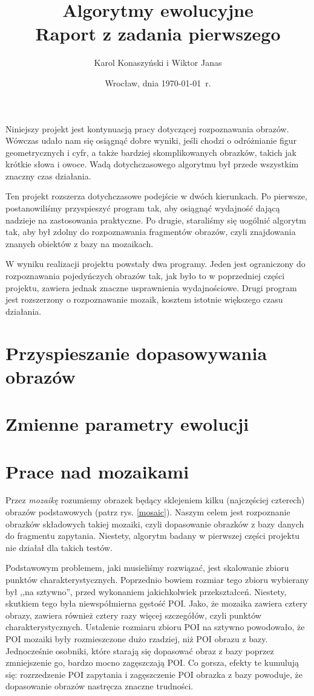 \documentclass[a4paper,12pt,leqno]{article}
\title{\textbf{Algorytmy ewolucyjne}\\
       {\Large Raport z zadania pierwszego}\\[-1ex]}
\author{Karol Konaszyński i Wiktor Janas}
\date{Wrocław, dnia \today\ r.}
\begin{document}
\maketitle

Niniejszy projekt jest kontynuacją pracy dotyczącej rozpoznawania obrazów. Wówczas udało nam się osiągnąć dobre wyniki, jeśli chodzi o odróżnianie figur geometrycznych i cyfr, a także bardziej
skomplikowanych obrazków, takich jak krótkie słowa i owoce. Wadą dotychczasowego algorytmu był przede wszystkim znaczny czas działania.

Ten projekt rozszerza dotychczasowe podejście w dwóch kierunkach. Po pierwsze, postanowiliśmy przyspieszyć program tak, aby osiągnąć wydajność dającą nadzieje na zastosowania praktyczne.
Po drugie, staraliśmy się uogólnić algorytm tak, aby był zdolny do rozpoznawania fragmentów obrazów, czyli znajdowania znanych obiektów z bazy na mozaikach.

W wyniku realizacji projektu powstały dwa programy. Jeden jest ograniczony do rozpoznawania pojedyńczych obrazów tak, jak było to w poprzedniej części projektu, zawiera jednak znaczne
usprawnienia wydajnościowe. Drugi program jest rozszerzony o rozpoznawanie mozaik, kosztem istotnie większego czasu działania.

\section{Przyspieszanie dopasowywania obrazów}

\section{Zmienne parametry ewolucji}

\section{Prace nad mozaikami}

Przez \textit{mozaikę} rozumiemy obrazek będący sklejeniem kilku (najczęściej czterech) obrazów podstawowych (patrz rys. \ref{mosaic}).
Naszym celem jest rozpoznanie obrazków składowych takiej mozaiki, czyli dopasowanie obrazków z bazy danych do fragmentu zapytania.
Niestety, algorytm badany w pierwszej części projektu nie działał dla takich testów.

Podstawowym problemem, jaki musieliśmy rozwiązać, jest skalowanie zbioru punktów charakterystycznych. 
Poprzednio bowiem rozmiar tego zbioru wybierany był ,,na sztywno'', przed wykonaniem jakichkolwiek przekształceń. Niestety, skutkiem tego była niewspółmierna gęstość POI. Jako, że mozaika
zawiera cztery obrazy, zawiera również cztery razy więcej szczegółów, czyli punktów charakterystycznych. Ustalenie rozmiaru zbioru POI na sztywno powodowało, że POI mozaiki
były rozmieszczone dużo rzadziej, niż POI obrazu z bazy. Jednocześnie osobniki, które starają się dopasować obraz z bazy poprzez zmniejszenie go, bardzo mocno zagęszczają POI.
Co gorsza, efekty te kumulują się: rozrzedzenie POI zapytania i zagęszczenie POI obrazka z bazy powoduje, że dopasowanie obrazów nastręcza znaczne trudności.
\end{document}
